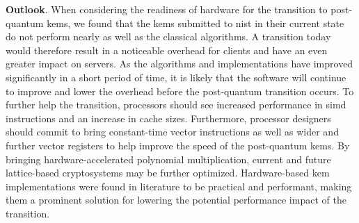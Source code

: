 


\noindent\textbf{Outlook}. When considering the readiness of hardware for the transition to \gls{post-quantum} \glspl{kem}, we found that the \glspl{kem} submitted to \gls{nist} in their current state do not perform nearly as well as the classical algorithms. A transition today would therefore result in a noticeable overhead for clients and have an even greater impact on servers. As the algorithms and implementations have improved significantly in a short period of time, it is likely that the software will continue to improve and lower the overhead before the \gls{post-quantum} transition occurs. To further help the transition, processors should see increased performance in \gls{simd} instructions and an increase in cache sizes. Furthermore, processor designers should commit to bring constant-time vector instructions as well as wider and further vector registers to help improve the speed of the \gls{post-quantum} \glspl{kem}. By bringing hardware-accelerated polynomial multiplication, current and future lattice-based cryptosystems may be further optimized. Hardware-based \gls{kem} implementations were found in literature to be practical and performant, making them a prominent solution for lowering the potential performance impact of the transition.


